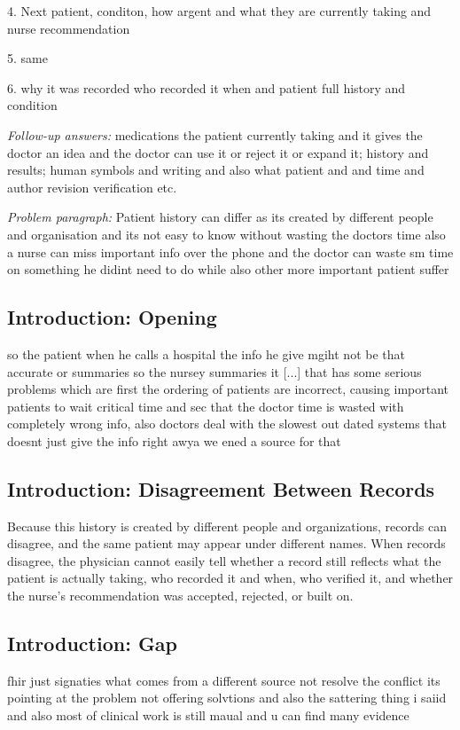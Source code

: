\documentclass[sigconf]{acmart}
\begin{document}
4. Next patient, conditon, how argent and what they are currently taking and nurse recommendation

5. same

6. why it was recorded who recorded it when and patient full history and condition

\textit{Follow-up answers:} medications the patient currently taking and it gives the doctor an idea and the doctor can use it or reject it or expand it; history and results; human symbols and writing and also what patient and and time and author revision verification etc.

\textit{Problem paragraph:} Patient history can differ as its created by different people and organisation and its not easy to know without wasting the doctors time also a nurse can miss important info over the phone and the doctor can waste sm time on something he didint need to do while also other more important patient suffer

\subsection{Introduction: Opening}
so the patient when he calls a hospital the info he give mgiht not be that accurate or summaries so the nursey summaries it [...] that has some serious problems which are first the ordering of patients are incorrect, causing important patients to wait critical time and sec that the doctor time is wasted with completely wrong info, also doctors deal with the slowest out dated systems that doesnt just give the info right awya we ened a source for that

\subsection{Introduction: Disagreement Between Records}
Because this history is created by different people and organizations, records can disagree, and the same patient may appear under different names. When records disagree, the physician cannot easily tell whether a record still reflects what the patient is actually taking, who recorded it and when, who verified it, and whether the nurse's recommendation was accepted, rejected, or built on.

\subsection{Introduction: Gap}
fhir just signaties what comes from a different source not resolve the conflict its pointing at the problem not offering solvtions and also the sattering thing i saiid and also most of clinical work is still maual and u can find many evidence
\end{document}
